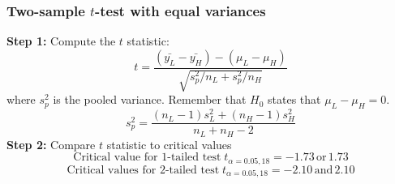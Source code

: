 \documentclass[color=usenames,dvipsnames]{beamer}\usepackage[]{graphicx}\usepackage[]{color}
\makeatletter
\def\maxwidth{ %
  \ifdim\Gin@nat@width>\linewidth
    \linewidth
  \else
    \Gin@nat@width
  \fi
}
\newenvironment{knitrout}{}{} %
\makeatother
\begin{document}
\begin{comment}
\begin{frame}[fragile]
  \frametitle{Example}
  \vspace{-0.5cm}
\begin{center}
\begin{knitrout}
\definecolor{shadecolor}{rgb}{0.878, 0.918, 0.933}\color{fgcolor}
\texttt{[image: figure/popsamp-1]} 

\end{knitrout}
\end{center}
\end{frame}
\end{comment}




\begin{frame}[fragile]
  \frametitle{Two-sample $t$-test with equal variances}
  {\bf Step 1:} Compute the $t$ statistic:
  \[
  t = \frac{(\bar{y_L} - \bar{y_H}) - (\mu_L - \mu_H)}{
    \sqrt{s^2_p/n_L + s^2_p/n_H}}
  \]
  where $s^2_p$ is the pooled variance. Remember that $H_0$ states that $\mu_L-\mu_H =0$.
  \[
  s^2_p = \frac{(n_L-1)s^2_L + (n_H-1)s^2_H}{n_L + n_H - 2}
  \]
  \pause
  {\bf Step 2:} Compare $t$ statistic to critical values
  \[
     \mbox{Critical value for 1-tailed test}\; t_{\alpha=0.05,18}= -1.73\, \mathrm{or}\, 1.73
  \]
  \[
     \mbox{Critical values for 2-tailed test}\; t_{\alpha=0.05,18}= -2.10\, \mathrm{and}\, 2.10
  \]
\end{frame}





\end{document}
